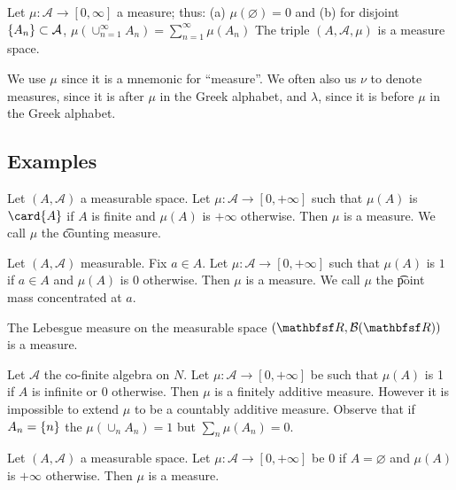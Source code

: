 Let $\mu : \mathcal{A}  \to [0, \infty]$ a measure;
thus:
(a) $\mu (\varnothing) = 0$ and
(b) for disjoint $\{A_n\} \subset \mathcal{A} $,
$\mu (\cup_{n = 1}^{\infty} A_n) = \sum_{n = 1}^{\infty} \mu (A_n)$
The triple $(A, \mathcal{A} , \mu )$ is a measure space.

We use $\mu $ since it is a mnemonic for ``measure''.
We often also us $\nu $ to denote measures, since it is after $\mu $ in the Greek alphabet, and $\lambda $, since it is before $\mu $ in the Greek alphabet.

\subsection*{Examples}

\begin{example}
Let $(A, \mathcal{A} )$ a measurable space.
Let $\mu : \mathcal{A}  \to [0, +\infty]$ such that $\mu (A)$ is $\card{A}$ if $A$ is finite and $\mu (A)$ is $+\infty$ otherwise.
Then $\mu $ is a measure.
We call $\mu $ the \t{counting measure}.
\end{example}

\begin{example}
Let $(A, \mathcal{A} )$ measurable.
Fix $a \in A$.
Let $\mu : \mathcal{A}  \to [0, +\infty]$ such that $\mu (A)$ is $1$ if $a \in A$ and $\mu (A)$ is $0$ otherwise.
Then $\mu $ is a measure.
We call $\mu $ the \t{point mass} concentrated at $a$.
\end{example}

\begin{expl}
The Lebesgue measure on the measurable space $(\R , \mathcal{B} (\R ))$ is a measure.
\end{expl}

\begin{expl}
Let $\mathcal{A} $ the co-finite algebra on $N$.
Let $\mu : \mathcal{A}  \to [0, +\infty]$ be such that $\mu (A)$ is 1 if $A$ is infinite or 0 otherwise.
Then $\mu $ is a finitely additive measure.
However it is impossible to extend $\mu $ to be a countably additive measure.
Observe that if $A_n = \{n\}$ the $\mu (\cup_{n} A_n) = 1$ but $\sum_{n} \mu (A_n) = 0$.
\end{expl}

\begin{expl}
Let $(A, \mathcal{A} )$ a measurable space.
Let $\mu : \mathcal{A}  \to [0, +\infty]$ be $0$ if $A = \varnothing$ and $\mu (A)$ is $+\infty$ otherwise.
Then $\mu $ is a measure.
\end{expl}

